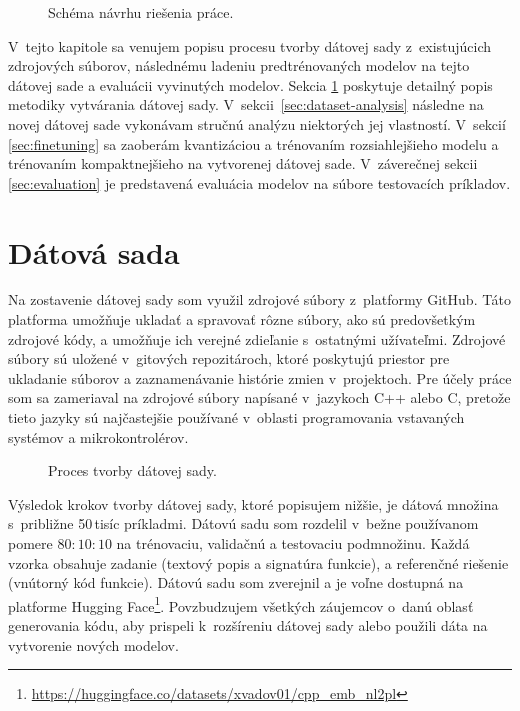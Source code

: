 \begin{figure}[!ht]
    \centering
    
    \caption{Schéma návrhu riešenia práce.}
    \label{fig:implementation}
\end{figure}

V~tejto kapitole sa venujem popisu procesu tvorby dátovej sady z~existujúcich zdrojových súborov, následnému ladeniu predtrénovaných modelov na tejto dátovej sade a evaluácii vyvinutých modelov. Sekcia \ref{sec:dataset} poskytuje detailný popis metodiky vytvárania dátovej sady. V~sekcii~\ref{sec:dataset-analysis} následne na novej dátovej sade vykonávam stručnú analýzu niektorých jej vlastností. V~sekcií \ref{sec:finetuning} sa zaoberám kvantizáciou a trénovaním rozsiahlejšieho modelu \CL{} a trénovaním kompaktnejšieho \SC{} na vytvorenej dátovej sade. V~záverečnej sekcii \ref{sec:evaluation} je predstavená evaluácia modelov na súbore testovacích príkladov.

\section{Dátová sada}\label{sec:dataset}

Na zostavenie dátovej sady som využil zdrojové súbory z~platformy GitHub. Táto platforma umožňuje ukladať a spravovať rôzne súbory, ako sú predovšetkým zdrojové kódy, a umožňuje ich verejné zdieľanie s~ostatnými užívateľmi. Zdrojové súbory sú uložené v~gitových repozitároch, ktoré poskytujú priestor pre ukladanie súborov a zaznamenávanie histórie zmien v~projektoch. Pre účely práce som sa zameriaval na zdrojové súbory napísané v~jazykoch C++ alebo C, pretože tieto jazyky sú najčastejšie používané v~oblasti programovania vstavaných systémov a mikrokontrolérov.

\begin{figure}[!ht]
    \centering
        
    \caption{Proces tvorby dátovej sady.}
    \label{fig:datset-prep}
\end{figure}

Výsledok krokov tvorby dátovej sady, ktoré popisujem nižšie, je dátová množina s~približne 50\,tisíc príkladmi. Dátovú sadu som rozdelil v~bežne používanom pomere $80:10:10$ na trénovaciu, validačnú a testovaciu podmnožinu. Každá vzorka obsahuje zadanie (textový popis a signatúra funkcie), a referenčné riešenie (vnútorný kód funkcie). Dátovú sadu som zverejnil a je voľne dostupná na platforme Hugging Face\footnote{\url{https://huggingface.co/datasets/xvadov01/cpp_emb_nl2pl}}. Povzbudzujem všetkých záujemcov o~danú oblasť generovania kódu, aby prispeli k~rozšíreniu dátovej sady alebo použili dáta na vytvorenie nových modelov.

